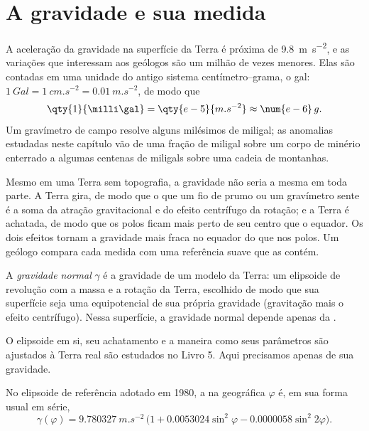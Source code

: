\section{A gravidade e sua medida}

A aceleração da gravidade na superfície da Terra é próxima de \qty{9.8}{m.s^{-2}}, e as
variações que interessam aos geólogos são um milhão de vezes menores. Elas são contadas em uma
unidade do antigo sistema centímetro--grama, o gal: $\qty{1}{Gal} = \qty{1}{cm.s^{-2}} = \qty{0.01}{m.s^{-2}}$, de modo
que
\[
  \qty{1}{\milli\gal} = \qty{e-5}{m.s^{-2}} \approx \num{e-6}\,g .
\]
Um gravímetro de campo resolve alguns milésimos de miligal; as anomalias
estudadas neste capítulo vão de uma fração de miligal sobre um corpo de minério enterrado a
algumas centenas de miligals sobre uma cadeia de montanhas.

Mesmo em uma Terra sem topografia, a gravidade não seria a mesma em toda parte. A Terra gira, de
modo que o que um fio de prumo ou um gravímetro sente é a soma da atração gravitacional e do
efeito centrífugo da rotação; e a Terra é achatada, de modo que os polos ficam mais perto de seu
centro que o equador.
Os dois efeitos tornam a gravidade mais fraca no equador do que nos polos. Um geólogo
compara cada medida com uma referência suave que as contém.

\begin{definition}\label{def:b1:isostasy-gravity:normal-gravity}
A \emph{gravidade normal} $\gamma$ é a gravidade de um modelo
da Terra: um elipsoide de revolução com a massa e a rotação da Terra, escolhido de modo que
sua superfície seja uma equipotencial de sua própria gravidade (gravitação mais o efeito
centrífugo). Nessa superfície, a gravidade normal depende apenas da .
\end{definition}

O elipsoide em si, seu achatamento e a maneira como seus parâmetros são ajustados à
Terra real são estudados no Livro 5. Aqui precisamos apenas de sua gravidade.

\begin{proposition}\label{prop:b1:isostasy-gravity:normal-formula}
No elipsoide de referência adotado em 1980, a  na  geográfica
$\varphi$ é, em sua forma usual em série,
\[
  \gamma(\varphi) = \qty{9.780327}{m.s^{-2}}\,\bigl(1 + 0.0053024\sin^2\varphi
  - 0.0000058\sin^2 2\varphi\bigr).
\]
\end{proposition}
\admitted

